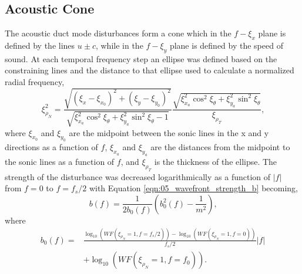 \subsection{Acoustic Cone}
The acoustic duct mode disturbances form a cone which in the $f-\xi_x$ plane is defined by the lines $u\pm c$, while in the $f-\xi_y$ plane is defined by the speed of sound.
At each temporal frequency step an ellipse was defined based on the constraining lines and the distance to that ellipse used to calculate a normalized radial frequency,
\begin{equation}
  \xi_{\rho_N}^2 = \frac{\sqrt{(\xi_x-\xi_{x_0})^2+(\xi_y-\xi_{y_0})^2}}{\sqrt{\xi^2_{x_a}\cos^2\xi_\theta+\xi^2_{y_a}\sin^2\xi_\theta-1}} \frac{\sqrt{\xi^2_{x_a}\cos^2\xi_\theta+\xi^2_{y_a}\sin^2\xi_\theta}}{\xi_{\rho_T}} \textrm{,}
\end{equation}
where $\xi_{x_0}$ and $\xi_{y_0}$ are the midpoint between the sonic lines in the x and y directions as a function of $f$, $\xi_{x_a}$ and $\xi_{y_a}$ are the distances from the midpoint to the sonic lines as a function of $f$, and $\xi_{\rho_T}$ is the thickness of the ellipse.
The strength of the disturbance was decreased logarithmically as a function of $|f|$ from $f=0$ to $f=f_s/2$ with Equation \ref{eqn:05_wavefront_strength_b} becoming,
\begin{equation}
  b(f) = \frac{1}{2b_0(f)}\left(b_0^2(f)-\frac{1}{m^2}\right) \textrm{,}
\end{equation}
where
\begin{equation}
  \begin{aligned}
    b_0(f) =& \frac{\log_{10}(WF(\xi_{\rho_N}=1,f=f_s/2))-\log_{10}(WF(\xi_{\rho_N}=1,f=0))}{f_s/2}|f| \\ &+\log_{10}(WF(\xi_{\rho_N}=1,f=f_0)) \textrm{.}
  \end{aligned}
\end{equation}

